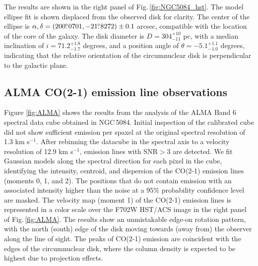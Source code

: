 \documentclass[modern]{CORE-AAS/aastex631}
\begin{document}
The results are shown in the right panel of Fig.\,\ref{fig:NGC5084_hst}. The model ellipse fit is shown displaced from the observed disk for clarity. The center of the ellipse is $\alpha, \delta = (200\mbox{$.\!\!^\circ$}0701, -21\mbox{$.\!\!^\circ$}8272) \pm 0.1$ arcsec, compatible with the location of the core of the galaxy. The disk diameter is  $D=304^{+10}_{-11}$ pc, with a median inclination of $i=71.2^{+1.8}_{-1.7}$ degrees, and a position angle of $\theta = -5.1^{+1.1}_{-1.0}$ degrees, indicating that the relative orientation of the circumnuclear disk is perpendicular to the galactic plane.
\subsection{ALMA CO(2-1) emission line observations}
\label{subsec:results_alma}
Figure \ref{fig:ALMA} shows the results from the analysis of the ALMA Band 6 spectral data cube obtained in NGC\,5084. Initial inspection of the calibrated cube did not show sufficient emission per spaxel at the original spectral resolution of 1.3 km s$^{-1}$. After rebinning the datacube in the spectral axis to a velocity resolution of 12.9 km s$^{-1}$, emission lines with SNR$>3$ are detected. We fit Gaussian models along the spectral direction for each pixel in the cube, identifying the intensity, centroid, and dispersion of the CO(2-1) emission lines (moments 0, 1, and 2). 
The positions that do not contain emission with an associated intensity higher than the noise at a $95\%$ probability confidence level are masked. The velocity map (moment 1) of the CO(2-1) emission lines is represented in a color scale over the F702W HST/ACS image in the right panel of Fig.\,\ref{fig:ALMA}. The results show an unmistakable edge-on rotation pattern, with the north (south) edge of the disk moving towards (away from) the observer along the line of sight. The peaks of CO(2-1) emission are coincident with the edges of the circumnuclear disk, where the column density is expected to be highest due to projection effects.\\ 
\end{document}
